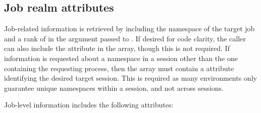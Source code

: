 \subsection{Job realm attributes}
\label{chap:api_rsvd_keys:jrealm}

Job-related information is retrieved by including the namespace of the target
job and a rank of  in the  argument
passed to . If desired for code clarity, the caller can also
include the  attribute in the  array,
though this is not required. If information is requested about a namespace in
a session other than the one containing the requesting process, then the
 array must contain a  attribute
identifying the desired target session. This is required as
many environments only guarantee unique namespaces within a session, and not
across sessions.

Job-level information includes the following attributes:

